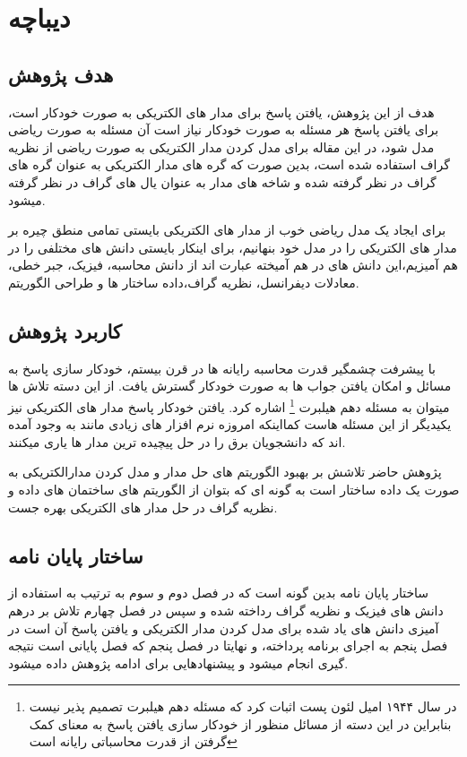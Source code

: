
\chapter{دیباچه}

\section{هدف پژوهش}

هدف از این پژوهش، یافتن پاسخ برای مدار های الکتریکی به صورت خودکار %
است، برای یافتن پاسخ هر مسئله به صورت خودکار نیاز است آن مسئله به صورت ریاضی مدل شود، در این مقاله برای مدل 
کردن مدار الکتریکی به صورت ریاضی از نظریه گراف
استفاده شده است، بدین صورت که گره های مدار الکتریکی به عنوان گره های گراف در نظر گرفته شده و شاخه های مدار به عنوان یال های گراف در نظر گرفته میشود.
 
برای ایجاد یک مدل ریاضی
خوب از مدار های الکتریکی بایستی تمامی منطق چیره بر مدار های الکتریکی را در مدل خود بنهانیم، برای اینکار بایستی دانش های مختلفی را در هم آمیزیم،این دانش های در هم آمیخته
عبارت اند از
دانش محاسبه،
 فیزیک،
  جبر خطی،
   معادلات دیفرانسل،
     نظریه گراف،داده ساختار ها
      و طراحی الگوریتم.
\section{کاربرد پژوهش}
با پیشرفت چشمگیر قدرت محاسبه رایانه ها در قرن بیستم،
خودکار سازی پاسخ به مسائل و امکان یافتن جواب ها به صورت خودکار گسترش یافت.
از این دسته تلاش ها میتوان به مسئله دهم هیلبرت 
\footnote{	  در سال ۱۹۴۴ امیل لئون پست اثبات کرد که مسئله دهم هیلبرت تصمیم پذیر نیست بنابراین در این دسته از مسائل منظور از خودکار سازی یافتن پاسخ به معنای کمک گرفتن از قدرت محاسباتی رایانه است 	}  
اشاره کرد. یافتن خودکار پاسخ مدار های الکتریکی نیز یکیدیگر از این مسئله هاست کمااینکه امروزه نرم افزار
های زیادی مانند
 به وجود آمده اند که دانشجویان برق را در حل پیچیده ترین مدار ها یاری میکنند.
 
 پژوهش حاضر تلاشش بر بهبود الگوریتم های حل مدار و مدل کردن مدارالکتریکی به صورت یک داده ساختار است
 به گونه ای که بتوان از الگوریتم های ساختمان های داده و نظریه گراف در حل مدار های الکتریکی بهره جست.
\section{ساختار پایان نامه}
ساختار پایان نامه بدین گونه است که در فصل دوم و سوم به ترتیب به استفاده از دانش های فیزیک و نظریه گراف رداخته شده و سپس در فصل چهارم تلاش بر درهم آمیزی دانش های یاد شده برای مدل کردن مدار الکتریکی و یافتن پاسخ آن است در فصل پنجم به اجرای برنامه پرداخته،
و نهایتا در فصل پنجم که فصل پایانی است نتیجه گیری انجام میشود و پیشنهادهایی برای ادامه پژوهش داده میشود.



